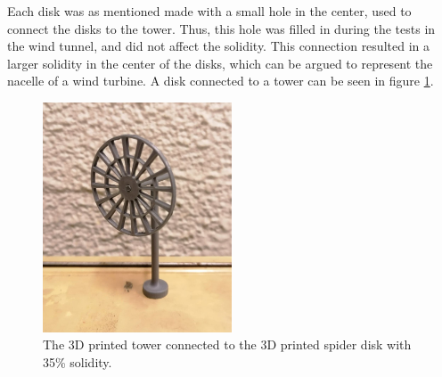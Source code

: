 Each disk was as mentioned made with a small hole in the center, used to connect the disks to the tower. Thus, this hole was filled in during the tests in the wind tunnel, and did not affect the solidity. This connection resulted in a larger solidity in the center of the disks, which can be argued to represent the nacelle of a wind turbine. A disk connected to a tower can be seen in figure \ref{Fig:towerAndAD}. 



\begin{figure}
    \centering
    \includegraphics[width=0.5\textwidth]{0_Images/baseAndAD.jpg}    
    \caption{The 3D printed tower connected to the 3D printed \gls{spider} disk with 35\% solidity.}
    \label{Fig:towerAndAD}
\end{figure}

\FloatBarrier


